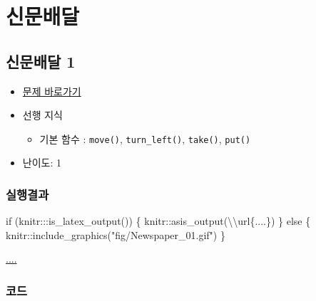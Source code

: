 \documentclass[
  b5paperpaper,
  DIV=11,
  numbers=noendperiod]{scrreprt}
\newenvironment{Shaded}{\begin{snugshade}}{\end{snugshade}}
\newcommand{\ControlFlowTok}[1]{\textcolor[rgb]{0.00,0.23,0.31}{#1}}
\newcommand{\FunctionTok}[1]{\textcolor[rgb]{0.28,0.35,0.67}{#1}}
\newcommand{\NormalTok}[1]{\textcolor[rgb]{0.00,0.23,0.31}{#1}}
\newcommand{\SpecialCharTok}[1]{\textcolor[rgb]{0.37,0.37,0.37}{#1}}
\newcommand{\StringTok}[1]{\textcolor[rgb]{0.13,0.47,0.30}{#1}}
\providecommand{\tightlist}{%
  \setlength{\itemsep}{0pt}\setlength{\parskip}{0pt}}\usepackage{longtable,booktabs,array}
\begin{document}
\hypertarget{newspaper}{%
\chapter{신문배달}\label{newspaper}}

\hypertarget{newspaper-01}{%
\section{신문배달 1}\label{newspaper-01}}

\begin{itemize}
\tightlist
\item
  \href{https://reeborg.ca/reeborg.html?lang=ko-en\&mode=python\&menu=worlds\%2Fmenus\%2Freeborg_intro_en.json\&name=Newspaper\%200\&url=worlds\%2Ftutorial_en\%2Fnewspaper0.json}{문제
  바로가기}
\item
  선행 지식

  \begin{itemize}
  \tightlist
  \item
    기본 함수 : \texttt{move()}, \texttt{turn\_left()}, \texttt{take()},
    \texttt{put()}
  \end{itemize}
\item
  난이도: 1
\end{itemize}

\hypertarget{uxc2e4uxd589uxacb0uxacfc-9}{%
\subsection{실행결과}\label{uxc2e4uxd589uxacb0uxacfc-9}}

\begin{Shaded}
\begin{Highlighting}[]
\ControlFlowTok{if}\NormalTok{ (knitr}\SpecialCharTok{:::}\FunctionTok{is\_latex\_output}\NormalTok{()) \{}
\NormalTok{  knitr}\SpecialCharTok{::}\FunctionTok{asis\_output}\NormalTok{(}\StringTok{\textquotesingle{}}\SpecialCharTok{\textbackslash{}\textbackslash{}}\StringTok{url\{....\}\textquotesingle{}}\NormalTok{)}
\NormalTok{\} }\ControlFlowTok{else}\NormalTok{ \{}
\NormalTok{  knitr}\SpecialCharTok{::}\FunctionTok{include\_graphics}\NormalTok{(}\StringTok{"fig/Newspaper\_01.gif"}\NormalTok{)}
\NormalTok{\}}
\end{Highlighting}
\end{Shaded}

\url{....}

\hypertarget{uxcf54uxb4dc-9}{%
\subsection{코드}\label{uxcf54uxb4dc-9}}
\end{document}
